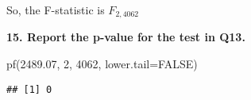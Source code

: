 \documentclass[
]{article}
\newenvironment{Shaded}{\begin{snugshade}}{\end{snugshade}}
\newcommand{\AttributeTok}[1]{\textcolor[rgb]{0.77,0.63,0.00}{#1}}
\newcommand{\ConstantTok}[1]{\textcolor[rgb]{0.00,0.00,0.00}{#1}}
\newcommand{\DecValTok}[1]{\textcolor[rgb]{0.00,0.00,0.81}{#1}}
\newcommand{\FloatTok}[1]{\textcolor[rgb]{0.00,0.00,0.81}{#1}}
\newcommand{\FunctionTok}[1]{\textcolor[rgb]{0.00,0.00,0.00}{#1}}
\newcommand{\NormalTok}[1]{#1}
\begin{document}
So, the F-statistic is \(F_{2,4062}\)

\textbf{15. Report the p-value for the test in Q13.}

\begin{Shaded}
\begin{Highlighting}[]
\FunctionTok{pf}\NormalTok{(}\FloatTok{2489.07}\NormalTok{, }\DecValTok{2}\NormalTok{, }\DecValTok{4062}\NormalTok{, }\AttributeTok{lower.tail=}\ConstantTok{FALSE}\NormalTok{)}
\end{Highlighting}
\end{Shaded}

\begin{verbatim}
## [1] 0
\end{verbatim}
\end{document}
